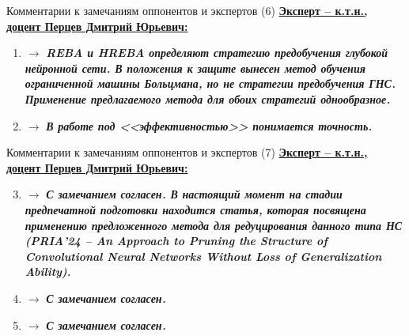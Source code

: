 \documentclass[10pt]{beamer}
\begin{document}
\begin{frame}{Комментарии к замечаниям оппонентов и экспертов (6)}
    \underline{\textbf{Эксперт -- к.т.н., доцент Перцев Дмитрий Юрьевич:}}
    \begin{enumerate}
        \item {}
        
        $\rightarrow$ \textit{\textbf{REBA и HREBA определяют стратегию предобучения глубокой нейронной сети. В положения к защите вынесен метод обучения ограниченной машины Больцмана, но не стратегии предобучения ГНС. Применение предлагаемого метода для обоих стратегий однообразное.}}
        \item {}
        
        $\rightarrow$ \textit{\textbf{В работе под <<эффективностью>> понимается точность.}}
    \end{enumerate}
\end{frame}

\begin{frame}{Комментарии к замечаниям оппонентов и экспертов (7)}
    \underline{\textbf{Эксперт -- к.т.н., доцент Перцев Дмитрий Юрьевич:}}
    \begin{enumerate}
        \setcounter{enumi}{2}
        \item {}
        
        $\rightarrow$ \textit{\textbf{С замечанием согласен. В настоящий момент на стадии предпечатной подготовки находится статья, которая посвящена применению предложенного метода для редуцирования данного типа НС (PRIA'24 -- An Approach to Pruning the Structure of Convolutional Neural Networks Without Loss of Generalization Ability).}}
        \item {}
        
        $\rightarrow$ \textit{\textbf{С замечанием согласен.}}
        \item {}
    
        $\rightarrow$ \textit{\textbf{С замечанием согласен.}}
    \end{enumerate}
\end{frame}
\end{document}
